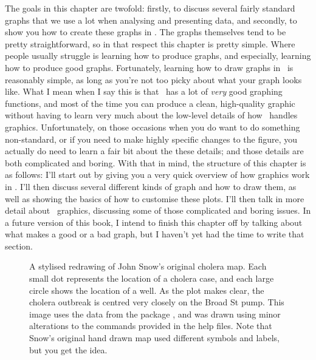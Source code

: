 The goals in this chapter are twofold: firstly, to discuss several fairly standard graphs that we use a lot when analysing and presenting data, and secondly, to show you how to create these graphs in \R. The graphs themselves tend to be pretty straightforward, so in that respect this chapter is pretty simple. Where people usually struggle is learning how to produce graphs, and especially, learning how to produce good graphs. Fortunately, learning how to draw graphs in \R\ is reasonably simple, as long as you're not too picky about what your graph looks like. What I mean when I say this is that \R\ has a lot of {\it very} good graphing functions, and most of the time you can produce a clean, high-quality graphic without having to learn very much about the low-level details of how \R\ handles graphics. Unfortunately, on those occasions when you do want to do something non-standard, or if you need to make highly specific changes to the figure, you actually do need to learn a fair bit about the these details; and those details are both complicated and boring. With that in mind, the structure of this chapter is as follows: I'll start out by giving you a very quick overview of how graphics work in \R. I'll then discuss several different kinds of graph and how to draw them, as well as showing the basics of how to customise these plots. I'll then talk in more detail about \R\ graphics, discussing some of those complicated and boring issues. In a future version of this book, I intend to finish this chapter off by talking about what makes a good or a bad graph, but I haven't yet had the time to write that section.

\begin{figure}[t!!]
\begin{center}
\caption{A stylised redrawing of John Snow's original cholera map. Each small dot represents the location of a cholera case, and each large circle shows the location of a well. As the plot makes clear, the cholera outbreak is centred very closely on the Broad St pump.  This image uses the data from the  package \protect\cite{Friendly2011}, and was drawn using minor alterations to the commands provided in the help files. Note that Snow's original hand drawn map used different symbols and labels, but you get the idea.}
\label{fig:snowmap1}
\HR
\end{center}
\end{figure}




